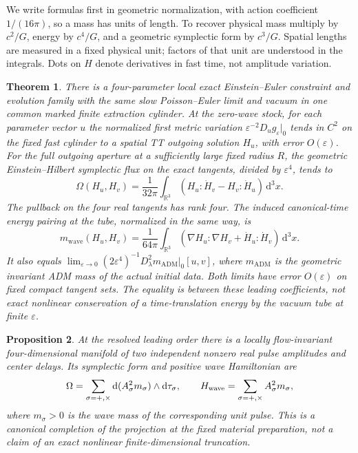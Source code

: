 \documentclass[11pt]{article}
\newtheorem{theorem}{Theorem}
\newtheorem{proposition}[theorem]{Proposition}
\theoremstyle{remark}
\newcommand{\dd}{\mathrm d}
\newcommand{\eps}{\varepsilon}
\newcommand{\R}{\mathbb R}
\newcommand{\M}{m_{\mathrm{ADM}}}
\begin{document}
We write formulas first in geometric normalization, with action coefficient \(1/(16\pi)\), so a mass has units of length. To recover physical mass multiply by \(c^2/G\), energy by \(c^4/G\), and a geometric symplectic form by \(c^3/G\). Spatial lengths are measured in a fixed physical unit; factors of that unit are understood in the integrals. Dots on \(H\) denote derivatives in fast time, not amplitude variation.

\begin{theorem}\label{thm:main}
There is a four-parameter local exact Einstein--Euler constraint and evolution family with the same slow Poisson--Euler limit and vacuum in one common marked finite extraction cylinder. At the zero-wave stock, for each parameter vector \(u\) the normalized first metric variation \(\eps^{-2}D_u g_\eps|_0\) tends in \(C^2\) on the fixed fast cylinder to a spatial TT outgoing solution \(H_u\), with error \(O(\eps)\). For the full outgoing aperture at a sufficiently large \emph{fixed} radius \(R\), the geometric Einstein--Hilbert symplectic flux on the exact tangents, divided by \(\eps^4\), tends to
\[
  \Omega(H_u,H_v)=\frac1{32\pi}\int_{\R^3}
                           (H_u:\dot H_v-H_v:\dot H_u)\,\dd^3x .
\]
The pullback on the four real tangents has rank four. The induced canonical-time energy pairing at the tube, normalized in the same way, is
\[
 m_{\mathrm{wave}}(H_u,H_v)=\frac1{64\pi}\int_{\R^3}
              (\nabla H_u:\nabla H_v+\dot H_u:\dot H_v)\,\dd^3x .
\]
It also equals
\(\lim_{\eps\to0}(2\eps^4)^{-1}D^2_\lambda\M|_0[u,v]\),
where \(\M\) is the geometric invariant ADM mass of the actual initial data. Both limits have error \(O(\eps)\) on fixed compact tangent sets. The equality is between these leading coefficients, not exact nonlinear conservation of a time-translation energy by the vacuum tube at finite \(\eps\).
\end{theorem}

\begin{proposition}\label{prop:delay}
At the resolved leading order there is a locally flow-invariant four-dimensional manifold of two independent nonzero real pulse amplitudes and center delays. Its symplectic form and positive wave Hamiltonian are
\[
      \Omega=\sum_{\sigma=+,\times}\dd(A_\sigma^2 m_\sigma)\wedge\dd\tau_\sigma,
           \qquad H_{\rm wave}=\sum_{\sigma=+,\times} A_\sigma^2m_\sigma,
\]
where \(m_\sigma>0\) is the wave mass of the corresponding unit pulse. This is a canonical completion of the projection at the fixed material preparation, not a claim of an exact nonlinear finite-dimensional truncation.
\end{proposition}
\end{document}
